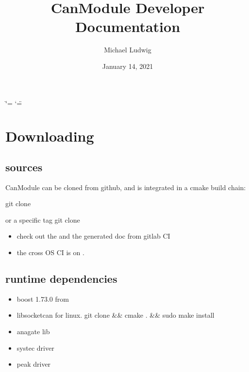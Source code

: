 \documentclass[a4paper,10pt,english]{sphinxmanual}
\title{CanModule Developer Documentation}
\date{January 14, 2021}
\author{Michael Ludwig}
\begin{document}
\ifdefined\shorthandoff
  \ifnum\catcode`\=\string=\active\shorthandoff{=}\fi
  \ifnum\catcode`\"=\active{}\fi
\fi

\pagestyle{empty}
\sphinxmaketitle
\pagestyle{plain}
\sphinxtableofcontents
\pagestyle{normal}
\label{\detokenize{index::doc}}



\chapter{Downloading}
\label{\detokenize{downloading:downloading}}\label{\detokenize{downloading::doc}}

\section{sources}
\label{\detokenize{downloading:sources}}
CanModule can be cloned from github, and is integrated in a cmake build chain:

git clone 

or a specific tag
git clone  
\begin{itemize}
\item {} 
check out the  and the generated doc from gitlab CI

\item {} 
the cross OS CI is on  .

\end{itemize}


\section{runtime dependencies}
\label{\detokenize{downloading:runtime-dependencies}}\begin{itemize}
\item {} 
boost 1.73.0 from 

\item {} 
libsocketcan for linux.
git clone  \&\& cmake . \&\& sudo make install

\item {} 
anagate lib

\item {} 
systec driver

\item {} 
peak driver

\end{itemize}
\end{document}
